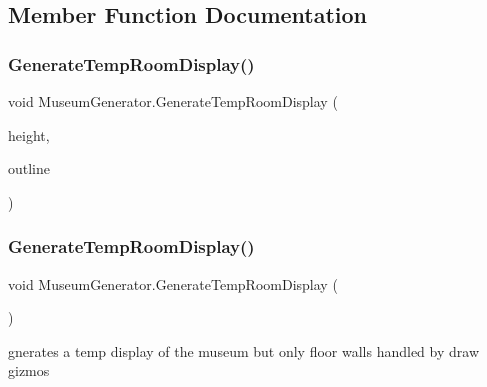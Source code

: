 \subsection{Member Function Documentation}
\mbox{\label{class_museum_generator_a65ac409691646fa2f92ee9b84294ac57}} 
\subsubsection{\texorpdfstring{Generate\+Temp\+Room\+Display()}{GenerateTempRoomDisplay()}\hspace{0.1cm}{\footnotesize\ttfamily [1/2]}}
{\footnotesize\ttfamily void Museum\+Generator.\+Generate\+Temp\+Room\+Display (\begin{DoxyParamCaption}\item[{int}]{height,  }\item[{Hash\+Set$<$ int $>$}]{outline }\end{DoxyParamCaption})}

\mbox{\label{class_museum_generator_a1b9419222535f317005ca9fe1fe757f3}} 
\subsubsection{\texorpdfstring{Generate\+Temp\+Room\+Display()}{GenerateTempRoomDisplay()}\hspace{0.1cm}{\footnotesize\ttfamily [2/2]}}
{\footnotesize\ttfamily void Museum\+Generator.\+Generate\+Temp\+Room\+Display (\begin{DoxyParamCaption}{ }\end{DoxyParamCaption})\hspace{0.3cm}{\ttfamily [private]}}



gnerates a temp display of the museum but only floor walls handled by draw gizmos 

